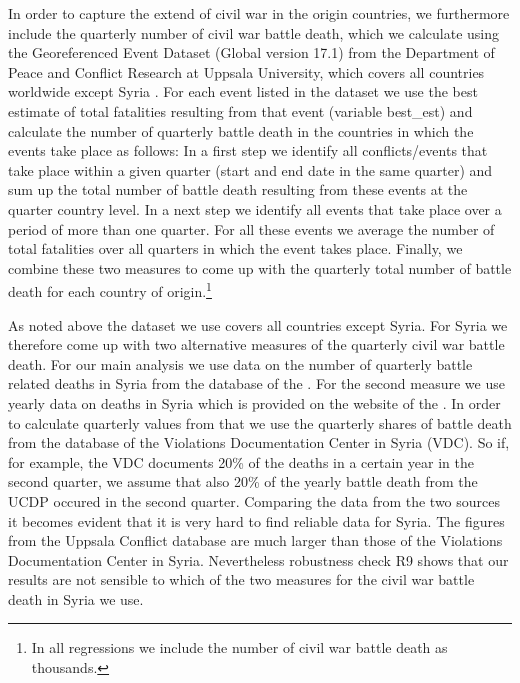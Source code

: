 \documentclass[11pt,a4paper]{scrartcl}
\begin{document}
In order to capture the extend of civil war in the origin countries, we furthermore include the quarterly number of civil war battle death, which we calculate using the Georeferenced Event Dataset (Global version 17.1) from the Department of Peace and Conflict Research at Uppsala University, which covers all countries worldwide except Syria \parencites{Uppsala2013, Uppsala2017}. For each event listed in the dataset we use the best estimate of total fatalities resulting from that event (variable best\_est) and calculate the number of quarterly battle death in the countries in which the events take place as follows: In a first step we identify all conflicts/events that take place within a given quarter (start and end date in the same quarter) and sum up the total number of battle death resulting from these events at the quarter country level. In a next step we identify all events that take place over a period of more than one quarter. For all these events we average the number of total fatalities over all quarters in which the event takes place. Finally, we combine these two measures to come up with the quarterly total number of battle death for each country of origin.\footnote{In all regressions we include the number of civil war battle death as thousands.}

As noted above the dataset we use covers all countries except Syria. For Syria we therefore come up with two alternative measures of the quarterly civil war battle death. For our main analysis we use data on the number of quarterly battle related deaths in Syria from the database of the \textcite{VDC2017}. For the second measure we use yearly data on deaths in Syria which is provided on the website of the  \textcite{UppsalaSyria2017}. In order to calculate quarterly values from that we use the quarterly shares of battle death from the database of the Violations Documentation Center in Syria (VDC). So if, for example, the VDC documents 20\% of the deaths in a certain year in the second quarter, we assume that also 20\% of the yearly battle death from the UCDP occured in the second quarter. Comparing the data from the two sources it becomes evident that it is very hard to find reliable data for Syria. The figures from the Uppsala Conflict database are much larger than those of the Violations Documentation Center in Syria. Nevertheless robustness check R9 shows that our results are not sensible to which of the two measures for the civil war battle death in Syria we use. 
\end{document}
